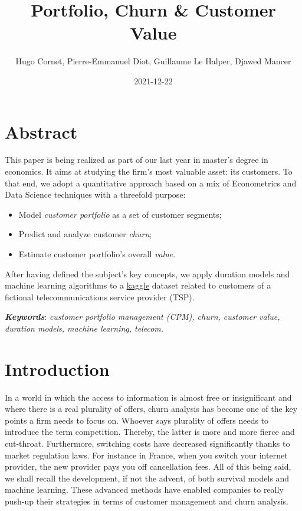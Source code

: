 \documentclass[
]{book}
\title{Portfolio, Churn \& Customer Value}
\author{Hugo Cornet, Pierre-Emmanuel Diot, Guillaume Le Halper, Djawed Mancer}
\date{2021-12-22}
\providecommand{\tightlist}{%
  \setlength{\itemsep}{0pt}\setlength{\parskip}{0pt}}
\begin{document}
\maketitle

{
\setcounter{tocdepth}{1}
\tableofcontents
}
\hypertarget{abstract}{%
\chapter*{Abstract}\label{abstract}}

This paper is being realized as part of our last year in master's degree in economics. It aims at studying the firm's most valuable asset: its customers. To that end, we adopt a quantitative approach based on a mix of Econometrics and Data Science techniques with a threefold purpose:

\begin{itemize}
\tightlist
\item
  Model \emph{customer portfolio} as a set of customer segments;
\item
  Predict and analyze customer \emph{churn};
\item
  Estimate customer portfolio's overall \emph{value}.
\end{itemize}

After having defined the subject's key concepts, we apply duration models and machine learning algorithms to a \href{https://www.kaggle.com/yeanzc/telco-customer-churn-ibm-dataset}{kaggle} dataset related to customers of a fictional telecommunications service provider (TSP).

\textbf{\emph{Keywords}}: \emph{customer portfolio management (CPM), churn, customer value, duration models, machine learning, telecom.}

\hypertarget{intro}{%
\chapter{Introduction}\label{intro}}

In a world in which the access to information is almost free or insignificant and where there is a real plurality of offers, churn analysis has become one of the key points a firm needs to focus on. Whoever says plurality of offers needs to introduce the term competition. Thereby, the latter is more and more fierce and cut-throat. Furthermore, switching costs have decreased significantly thanks to market regulation laws. For instance in France, when you switch your internet provider, the new provider pays you off cancellation fees. All of this being said, we shall recall the development, if not the advent, of both survival models and machine learning. These advanced methods have enabled companies to really push-up their strategies in terms of customer management and churn analysis.
\end{document}
